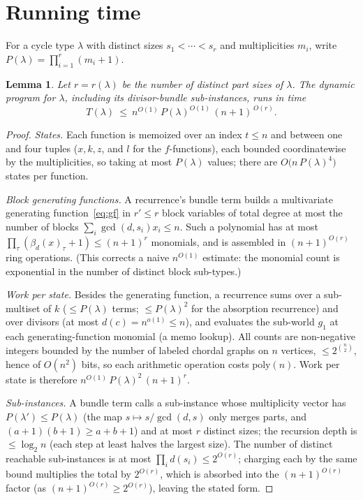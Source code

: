 \documentclass[11pt]{article}
\theoremstyle{plain}
\newtheorem{lemma}{Lemma}
\theoremstyle{definition}
\begin{document}
\section{Running time}\label{sec:time}

For a cycle type $\lambda$ with distinct sizes $s_1<\cdots<s_r$ and multiplicities $m_i$, write
$P(\lambda)=\prod_{i=1}^r(m_i+1)$.

\begin{lemma}\label{lem:percost}
Let $r=r(\lambda)$ be the number of distinct part sizes of $\lambda$. The dynamic program for
$\lambda$, including its divisor-bundle sub-instances, runs in time
\[
T(\lambda)\ \le\ n^{O(1)}\,P(\lambda)^{O(1)}\,(n+1)^{\,O(r)}.
\]
\end{lemma}

\begin{proof}
\emph{States.} Each function is memoized over an index $t\le n$ and between one and four tuples
($x,k,z$, and $l$ for the $f$-functions), each bounded coordinatewise by the multiplicities, so
taking at most $P(\lambda)$ values; there are $O\!\big(n\,P(\lambda)^4\big)$ states per function.

\emph{Block generating functions.} A recurrence's bundle term builds a multivariate generating
function~\eqref{eq:gf} in $r'\le r$ block variables of total degree at most the number of blocks
$\sum_i\gcd(d,s_i)x_i\le n$. Such a polynomial has at most $\prod_\tau(\beta_d(x)_\tau+1)\le(n+1)^{r}$
monomials, and is assembled in $(n+1)^{O(r)}$ ring operations. (This corrects a naive
$n^{O(1)}$ estimate: the monomial count is exponential in the number of distinct block sub-types.)

\emph{Work per state.} Besides the generating function, a recurrence sums over a sub-multiset of $k$
($\le P(\lambda)$ terms; $\le P(\lambda)^2$ for the absorption recurrence) and over divisors
(at most $d(c)=n^{o(1)}\le n$), and evaluates the sub-world $g_1$ at each generating-function monomial (a memo
lookup). All counts are non-negative integers bounded by the number of labeled chordal graphs on $n$
vertices, $\le 2^{\binom n2}$, hence of $O(n^2)$ bits, so each arithmetic operation costs
$\mathrm{poly}(n)$. Work per state is therefore $n^{O(1)}\,P(\lambda)^{2}\,(n+1)^{r}$.

\emph{Sub-instances.} A bundle term calls a sub-instance whose multiplicity vector has
$P(\lambda')\le P(\lambda)$ (the map $s\mapsto s/\gcd(d,s)$ only merges parts, and
$(a{+}1)(b{+}1)\ge a{+}b{+}1$) and at most $r$ distinct sizes; the recursion depth is $\le\log_2 n$
(each step at least halves the largest size). The number of distinct reachable sub-instances is at
most $\prod_i d(s_i)\le 2^{O(r)}$; charging each by the same bound multiplies the total by $2^{O(r)}$,
which is absorbed into the $(n+1)^{O(r)}$ factor (as $(n+1)^{O(r)}\ge 2^{O(r)}$), leaving the stated
form.
\end{proof}
\end{document}

